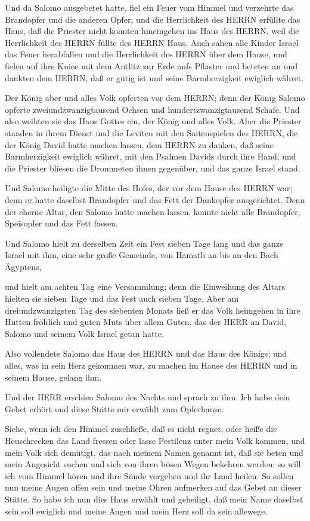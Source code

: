  Und da Salomo ausgebetet hatte, fiel ein Feuer vom Himmel
und verzehrte das Brandopfer und die anderen Opfer; und die Herrlichkeit
des HERRN erfüllte das Haus,  daß die Priester nicht konnten
hineingehen ins Haus des HERRN, weil die Herrlichkeit des HERRN füllte
des HERRN Haus.  Auch sahen alle Kinder Israel das Feuer
herabfallen und die Herrlichkeit des HERRN über dem Hause, und fielen
auf ihre Kniee mit dem Antlitz zur Erde aufs Pflaster und beteten an und
dankten dem HERRN, daß er gütig ist und seine Barmherzigkeit ewiglich
währet.

 Der König aber und alles Volk opferten vor dem HERRN;
 denn der König Salomo opferte zweiundzwanzigtausend Ochsen
und hundertzwanzigtausend Schafe. Und also weihten sie das Haus Gottes
ein, der König und alles Volk.  Aber die Priester standen in
ihrem Dienst und die Leviten mit den Saitenspielen des HERRN, die der
König David hatte machen lassen, dem HERRN zu danken, daß seine
Barmherzigkeit ewiglich währet, mit den Psalmen Davids durch ihre Hand;
und die Priester bliesen die Drommeten ihnen gegenüber, und das ganze
Israel stand.

 Und Salomo heiligte die Mitte des Hofes, der vor dem Hause
des HERRN war; denn er hatte daselbst Brandopfer und das Fett der
Dankopfer ausgerichtet. Denn der eherne Altar, den Salomo hatte machen
lassen, konnte nicht alle Brandopfer, Speisopfer und das Fett fassen.

 Und Salomo hielt zu derselben Zeit ein Fest sieben Tage
lang und das ganze Israel mit ihm, eine sehr große Gemeinde, von Hamath
an bis an den Bach Ägyptens,

 und hielt am achten Tag eine Versammlung; denn die
Einweihung des Altars hielten sie sieben Tage und das Fest auch sieben
Tage.  Aber am dreiundzwanzigsten Tag des siebenten Monats
ließ er das Volk heimgehen in ihre Hütten fröhlich und guten Muts über
allem Guten, das der HERR an David, Salomo und seinem Volk Israel getan
hatte.

 Also vollendete Salomo das Haus des HERRN und das Haus des
Königs; und alles, was in sein Herz gekommen war, zu machen im Hause des
HERRN und in seinem Hause, gelang ihm.

 Und der HERR erschien Salomo des Nachts und sprach zu ihm:
Ich habe dein Gebet erhört und diese Stätte mir erwählt zum Opferhause.

 Siehe, wenn ich den Himmel zuschließe, daß es nicht
regnet, oder heiße die Heuschrecken das Land fressen oder lasse
Pestilenz unter mein Volk kommen,  und mein Volk sich
demütigt, das nach meinem Namen genannt ist, daß sie beten und mein
Angesicht suchen und sich von ihren bösen Wegen bekehren werden: so will
ich vom Himmel hören und ihre Sünde vergeben und ihr Land heilen.
 So sollen nun meine Augen offen sein und meine Ohren
aufmerken auf das Gebet an dieser Stätte.  So habe ich nun
dies Haus erwählt und geheiligt, daß mein Name daselbst sein soll
ewiglich und meine Augen und mein Herz soll da sein allewege.

